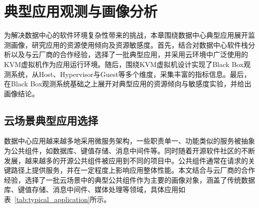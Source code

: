 \chapter{典型应用观测与画像分析}\label{chap:profiling}





为解决数据中心的软件环境复杂性带来的挑战，本章围绕数据中心典型应用展开监测画像，研究应用的资源使用倾向及资源敏感度。首先，结合对数据中心软件栈分析以及与云厂商的合作经验，选择了一批典型应用，并采用云环境中广泛使用的KVM虚拟机作为应用运行环境。随后，围绕KVM虚拟机设计实现了Black Box观测系统，从Host、Hypervisor与Guest等多个维度，采集丰富的指标信息。最后，在Black Box观测系统基础之上展开对典型应用的资源倾向与敏感度实验，并给出画像结论。

\section{云场景典型应用选择}



数据中心应用越来越多地采用微服务架构，一些职责单一、功能类似的服务被抽象为公共组件，如数据库、键值存储、消息中间件等。同时随着开源软件社区的不断发展，越来越多的开源公共组件被应用到不同的项目中。公共组件通常在请求的关键路径上提供服务，并在一定程度上影响应用整体性能。本文结合与云厂商的合作经验，选择了一批云场景中的典型公共组件作为主要的画像对象，涵盖了传统数据库、键值存储、消息中间件、媒体处理等领域，具体应用如表~\ref{tab:typical_application}所示。

